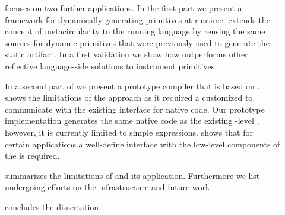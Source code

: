 \begin{description}
\item[] focuses on two further \B applications.
	In the first part we present \WF a framework for dynamically generating primitives at runtime.
	\WF extends the concept of metacircularity to the running language by reusing the same sources for dynamic primitives that were previously used to generate the static \VM artifact.
	In a first validation we show how \WF outperforms other reflective language-side solutions to instrument primitives.
	
	In a second part of  we present \NBJ a prototype \JIT compiler that is based on \B.
	\NBJ shows the limitations of the \B approach as it required a customized \VM to communicate with the existing \JIT interface for native code.
	Our prototype implementation generates the same native code as the existing \VM-level \JIT, however, it is currently limited to simple expressions.
	\NBJ shows that for certain applications a well-define interface with the low-level components of the \VM is required.

\item[] summarizes the limitations of \B and its application.
Furthermore we list undergoing efforts on the \B infrastructure and future work.

\item[] concludes the dissertation.

\end{description}


